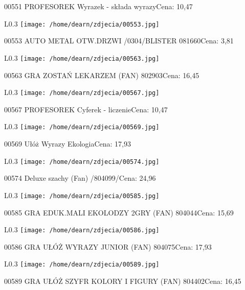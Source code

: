 00551 PROFESOREK Wyrazek - składa wyrazyCena: 10,47\newline
\begin{wrapfigure}{L}{0.3\textwidth}
\texttt{[image: /home/dearn/zdjecia/00553.jpg]}
\end{wrapfigure}
00553 AUTO METAL OTW.DRZWI  /0304/BLISTER             081660Cena: 3,81\newline
\begin{wrapfigure}{L}{0.3\textwidth}
\texttt{[image: /home/dearn/zdjecia/00563.jpg]}
\end{wrapfigure}
00563 GRA ZOSTAŃ LEKARZEM     (FAN)                   802903Cena: 16,45\newline
\begin{wrapfigure}{L}{0.3\textwidth}
\texttt{[image: /home/dearn/zdjecia/00567.jpg]}
\end{wrapfigure}
00567 PROFESOREK Cyferek - liczenieCena: 10,47\newline
\begin{wrapfigure}{L}{0.3\textwidth}
\texttt{[image: /home/dearn/zdjecia/00569.jpg]}
\end{wrapfigure}
00569 Ułóż Wyrazy EkologiaCena: 17,93\newline
\begin{wrapfigure}{L}{0.3\textwidth}
\texttt{[image: /home/dearn/zdjecia/00574.jpg]}
\end{wrapfigure}
00574 Deluxe szachy (Fan) /804099/Cena: 24,96\newline
\begin{wrapfigure}{L}{0.3\textwidth}
\texttt{[image: /home/dearn/zdjecia/00585.jpg]}
\end{wrapfigure}
00585 GRA EDUK.MALI EKOLODZY  2GRY   (FAN)            804044Cena: 15,69\newline
\begin{wrapfigure}{L}{0.3\textwidth}
\texttt{[image: /home/dearn/zdjecia/00586.jpg]}
\end{wrapfigure}
00586 GRA UŁÓŻ WYRAZY JUNIOR   (FAN)                  804075Cena: 17,93\newline
\begin{wrapfigure}{L}{0.3\textwidth}
\texttt{[image: /home/dearn/zdjecia/00589.jpg]}
\end{wrapfigure}
00589 GRA UŁÓŻ SZYFR KOLORY I FIGURY   (FAN)          804402Cena: 16,45\newline
